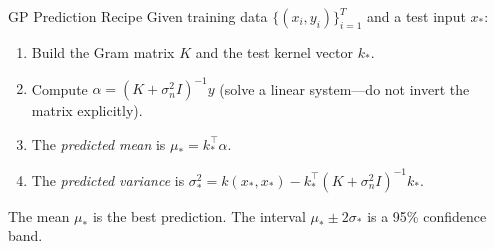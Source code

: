 \begin{summarybox}{GP Prediction Recipe}
	Given training data $\{(x_i, y_i)\}_{i=1}^T$ and a test input $x_*$:
	\begin{enumerate}[noitemsep]
		\item Build the Gram matrix $K$ and the test kernel vector $k_*$.
		\item Compute $\alpha = (K + \sigma_n^2 I)^{-1}y$ (solve a linear system---do not invert the matrix explicitly).
		\item The \emph{predicted mean} is $\mu_* = k_*^\top \alpha$.
		\item The \emph{predicted variance} is $\sigma_*^2 = k(x_*,x_*) - k_*^\top (K + \sigma_n^2 I)^{-1}k_*$.
	\end{enumerate}
	The mean $\mu_*$ is the best prediction. The interval $\mu_* \pm 2\sigma_*$ is a 95\% confidence band.
\end{summarybox}

